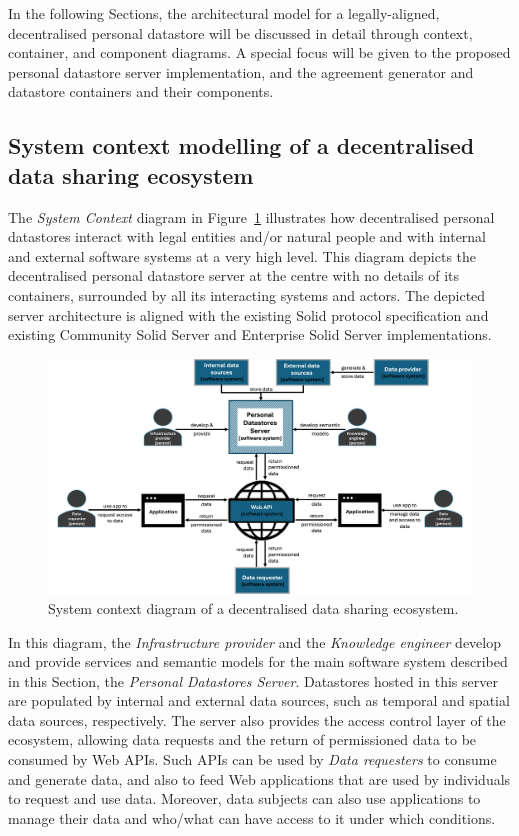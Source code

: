 In the following Sections, the architectural model for a legally-aligned, decentralised personal datastore will be discussed in detail through context, container, and component diagrams.
A special focus will be given to the proposed personal datastore server implementation, and the agreement generator and datastore containers and their components. 

\subsection{System context modelling of a decentralised data sharing ecosystem}
\label{sec:c4_context}

The \textit{System Context} diagram in Figure~\ref{fig:c4-context} illustrates how decentralised personal datastores interact with legal entities and/or natural people and with internal and external software systems at a very high level.
This diagram depicts the decentralised personal datastore server at the centre with no details of its containers, surrounded by all its interacting systems and actors.
The depicted server architecture is aligned with the existing Solid protocol specification \citep{capadisli_solid_2022} and existing Community Solid Server and Enterprise Solid Server implementations.

\begin{figure}[ht]
    \centering
    \includegraphics[width=1\linewidth]{figures//chapter-6/system-context-diagram.png}
    \caption{System context diagram of a decentralised data sharing ecosystem.}
    \label{fig:c4-context}
\end{figure}

In this diagram, the \textit{Infrastructure provider} and the \textit{Knowledge engineer} develop and provide services and semantic models for the main software system described in this Section, the \textit{Personal Datastores Server}.
Datastores hosted in this server are populated by internal and external data sources, such as temporal and spatial data sources, respectively.
The server also provides the access control layer of the ecosystem, allowing data requests and the return of permissioned data to be consumed by Web APIs.
Such APIs can be used by \textit{Data requesters} to consume and generate data, and also to feed Web applications that are used by individuals to request and use data.
Moreover, data subjects can also use applications to manage their data and who/what can have access to it under which conditions.

